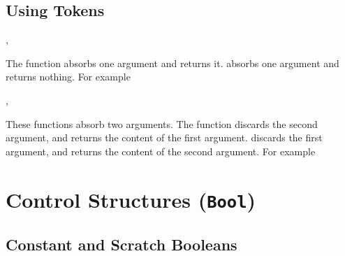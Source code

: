 \documentclass[oneside]{book}
\let\tn=\cs
\begin{document}
\section{Using Tokens}

\begin{function}{\useOne,\gobbleOne}
\begin{syntax}
 
 
\end{syntax}
The function  absorbs one argument and returns it.
 absorbs one argument and returns nothing.
For example
\begin{demohigh}
\end{demohigh}
\end{function}

\begin{function}{\useGobble,\gobbleUse}
\begin{syntax}
  
  
\end{syntax}
These functions absorb two arguments.
The function  discards the second argument,
and returns the content of the first argument.
 discards the first argument,
and returns the content of the second argument.
For example
\begin{demohigh}
\end{demohigh}
\end{function}

\chapter{Control Structures (\texttt{Bool})}

\section{Constant and Scratch Booleans}
\end{document}

